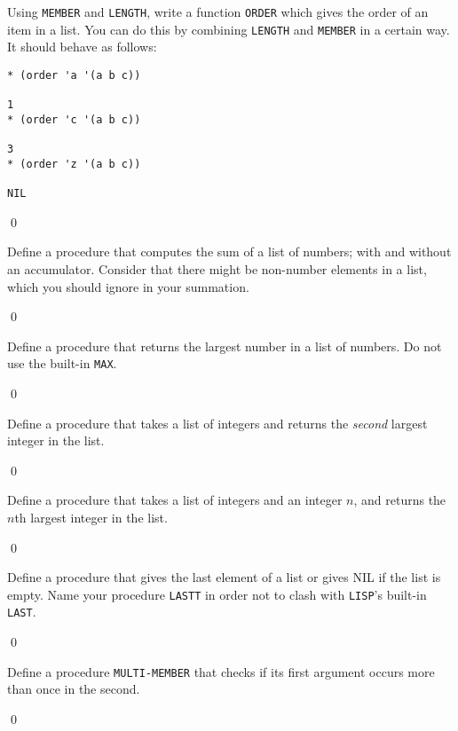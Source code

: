 \documentclass[a4paper,11pt]{article}
\begin{document}
\begin{uexercise}
\label{order}
Using \Verb+MEMBER+  and \Verb+LENGTH+, write a function \Verb+ORDER+ which gives the order of an item in a list. You can do this by combining \Verb+LENGTH+ and \Verb+MEMBER+ in a certain way. It should behave as follows:

{\small
\begin{Verbatim}
* (order 'a '(a b c))

1
* (order 'c '(a b c))

3
* (order 'z '(a b c))

NIL
\end{Verbatim}
}

\qed
\end{uexercise}

\begin{uexercise}
Define a procedure that computes the sum of a list of numbers; with
and without an accumulator. Consider that there might be non-number
elements in a list, which you should ignore in your summation.

\qed
\end{uexercise}

\begin{uexercise}
Define a procedure that returns the largest number in a list of numbers. Do not use the built-in \Verb+MAX+.

\qed
\end{uexercise}

\begin{uexercise}
Define a procedure that takes a list of integers and returns the \emph{second} largest integer in the list.

\qed
\end{uexercise}

\begin{uexercise}
Define a procedure that takes a list of integers and an integer $n$, and returns the $n$th largest integer in the list.

\qed
\end{uexercise}

\begin{uexercise}
\label{exlast}
Define a procedure that gives the last element of a list or gives NIL if the list is empty. Name your procedure  \Verb+LASTT+ in order not to clash with  \Verb+LISP+'s built-in \Verb+LAST+. 

\qed
\end{uexercise}

\begin{uexercise}
Define a procedure \Verb+MULTI-MEMBER+ that checks if its first argument occurs more than once in the second.

\qed
\end{uexercise}
\end{document}
